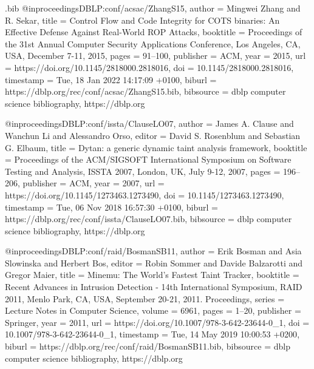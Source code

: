 \begin{filecontents}{\jobname.bib}
@inproceedings{DBLP:conf/acsac/ZhangS15,
  author       = {Mingwei Zhang and
                  R. Sekar},
  title        = {Control Flow and Code Integrity for {COTS} binaries: An Effective
                  Defense Against Real-World {ROP} Attacks},
  booktitle    = {Proceedings of the 31st Annual Computer Security Applications Conference,
                  Los Angeles, CA, USA, December 7-11, 2015},
  pages        = {91--100},
  publisher    = {{ACM}},
  year         = {2015},
  url          = {https://doi.org/10.1145/2818000.2818016},
  doi          = {10.1145/2818000.2818016},
  timestamp    = {Tue, 18 Jan 2022 14:17:09 +0100},
  biburl       = {https://dblp.org/rec/conf/acsac/ZhangS15.bib},
  bibsource    = {dblp computer science bibliography, https://dblp.org}
}

@inproceedings{DBLP:conf/issta/ClauseLO07,
  author       = {James A. Clause and
                  Wanchun Li and
                  Alessandro Orso},
  editor       = {David S. Rosenblum and
                  Sebastian G. Elbaum},
  title        = {Dytan: a generic dynamic taint analysis framework},
  booktitle    = {Proceedings of the {ACM/SIGSOFT} International Symposium on Software
                  Testing and Analysis, {ISSTA} 2007, London, UK, July 9-12, 2007},
  pages        = {196--206},
  publisher    = {{ACM}},
  year         = {2007},
  url          = {https://doi.org/10.1145/1273463.1273490},
  doi          = {10.1145/1273463.1273490},
  timestamp    = {Tue, 06 Nov 2018 16:57:30 +0100},
  biburl       = {https://dblp.org/rec/conf/issta/ClauseLO07.bib},
  bibsource    = {dblp computer science bibliography, https://dblp.org}
}

@inproceedings{DBLP:conf/raid/BosmanSB11,
  author       = {Erik Bosman and
                  Asia Slowinska and
                  Herbert Bos},
  editor       = {Robin Sommer and
                  Davide Balzarotti and
                  Gregor Maier},
  title        = {Minemu: The World's Fastest Taint Tracker},
  booktitle    = {Recent Advances in Intrusion Detection - 14th International Symposium,
                  {RAID} 2011, Menlo Park, CA, USA, September 20-21, 2011. Proceedings},
  series       = {Lecture Notes in Computer Science},
  volume       = {6961},
  pages        = {1--20},
  publisher    = {Springer},
  year         = {2011},
  url          = {https://doi.org/10.1007/978-3-642-23644-0\_1},
  doi          = {10.1007/978-3-642-23644-0\_1},
  timestamp    = {Tue, 14 May 2019 10:00:53 +0200},
  biburl       = {https://dblp.org/rec/conf/raid/BosmanSB11.bib},
  bibsource    = {dblp computer science bibliography, https://dblp.org}
}


\end{filecontents}
